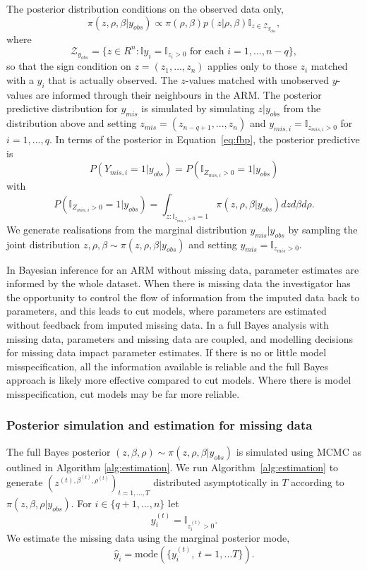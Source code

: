 \documentclass{article}
\begin{document}
The posterior distribution conditions on the observed data only,
\begin{equation}\label{eq:fbp}
\pi (z, \rho, \beta | y_{obs} ) \propto \pi (\rho, \beta) p(z | \rho, \beta)\mathbb{I}_{z\in \mathcal{Z}_{y_{obs}}},
\end{equation}
where
\[
\mathcal{Z}_{y_{obs}}=\{z\in R^n: \mathbb{I} y_i = \mathbb{I}_{z_i > 0} \mbox{\ for each\ } i=1,...,n-q\},
\]
so that the sign condition on $z=(z_1,...,z_n)$ applies only to those $z_i$ matched with a $y_i$ that is actually observed.
The $z$-values matched with unobserved $y$-values are informed through their neighbours in the ARM.
The posterior predictive distribution for $y_{mis}$ is
simulated by simulating $z|y_{obs}$ from the distribution above
and setting $z_{mis}=(z_{n-q+1},...,z_n)$ and $y_{mis,i}=\mathbb{I}_{z_{mis,i}>0}$ for $i=1,...,q$.
In terms of the posterior in Equation~\ref{eq:fbp}, the posterior predictive is
\begin{equation}\label{eq:p1}
P(Y_{mis,i}=1|y_{obs})=P(\mathbb{I}_{Z_{mis,i} > 0}=1|y_{obs})
\end{equation}
with
\[
P(\mathbb{I}_{Z_{mis,i} > 0}=1|y_{obs})=\int_{z: \mathbb{I}_{z_{mis,i} > 0}=1}\pi (z, \rho, \beta | y_{obs} )dz d\beta d\rho.
\]
We generate realisations from the marginal distribution $y_{mis}|y_{obs}$ by sampling the joint distribution
$z,\rho,\beta \sim \pi(z, \rho, \beta | y_{obs} )$ and setting $y_{mis}=\mathbb{I}_{z_{mis}>0}$.
	
In Bayesian inference for an ARM without missing data, parameter estimates are informed by the whole dataset. When there is missing data
the investigator has the opportunity to control the flow of information from the imputed data back to parameters, and this leads to cut models,
where parameters are estimated without feedback from imputed missing data.
In a full Bayes analysis with missing data, parameters and missing data are coupled, and modelling decisions for missing data impact parameter estimates.
If there is no or little model misspecification, all the information available is reliable and the full Bayes approach is likely more effective compared to cut models.
Where there is model misspecification, cut models may be far more reliable.

\subsubsection{Posterior simulation and estimation for missing data}\label{sec:FBest}
The full Bayes posterior $(z,\beta,\rho)\sim \pi (z, \rho, \beta | y_{obs} ) $
is simulated using MCMC as outlined in Algorithm \ref{alg:estimation}.
We run Algorithm~\ref{alg:estimation} to generate $(z^{(t),\beta^{(t)},\rho^{(t)}})_{t=1,...,T}$ distributed asymptotically in $T$ according to $\pi (z, \beta, \rho | y_{obs} )$.
For $i\in \{q+1,...,n\}$ let
\begin{equation}\label{eq:defy}
y^{(t)}_i=\mathbb{I}_{z^{(t)}_i>0}.
\end{equation}
We estimate the missing data using the marginal posterior mode,
\begin{equation}\label{eq:defyhat}
\hat y_i=\mbox{mode}(\{y^{(t)}_i,\ {t=1,...T}\}).
\end{equation}
\end{document}

